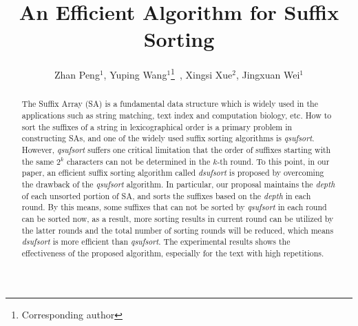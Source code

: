 \documentclass{ws-ijprai}
\begin{document}

%
\catchline{}{}{}{}{}
%

\title{An Efficient Algorithm for Suffix Sorting}


\author{Zhan Peng$^1$, Yuping Wang$^1$\footnote{Corresponding author}~,
Xingsi Xue$^2$, Jingxuan Wei$^1$}

\address{$^1$School of Computer Science and Technology\\
  Xidian University\\
  Xi'an, Shaanxi, 710071, China\\
   $^*$ywang@xidian.edu.cn
}

\address{$^2$School of Information Science and Engineering\\
  Fujian University of Technology\\
  Fuzhou, Fujian, 350118, China\\}

\maketitle


\begin{abstract} The Suffix Array (SA) is a fundamental data structure
which is widely used in the applications such as string matching, text
index and computation biology, etc. How to sort the suffixes of a string in
lexicographical order is a primary problem in constructing SAs, and
one of the widely used suffix sorting algorithms is
\emph{qsufsort}. However, \emph{qsufsort} suffers one critical
limitation that the order of suffixes starting with the same $2^k$
characters can not be determined in the $k$-th round. To this point,
in our paper, an efficient suffix sorting algorithm called
\emph{dsufsort} is proposed by overcoming the drawback of the
\emph{qsufsort} algorithm. In particular, our proposal maintains the
\emph{depth} of each unsorted portion of SA, and sorts the suffixes
based on the \emph{depth} in each round. By this means, some suffixes
that can not be sorted by \emph{qsufsort} in each round can be sorted
now, as a result, more sorting results in current round can be
utilized by the latter rounds and the total number of sorting rounds
will be reduced, which means \emph{dsufsort} is more efficient than
\emph{qsufsort}. The experimental results shows the effectiveness of
the proposed algorithm, especially for the text with high repetitions.
\end{abstract}
\end{document}
